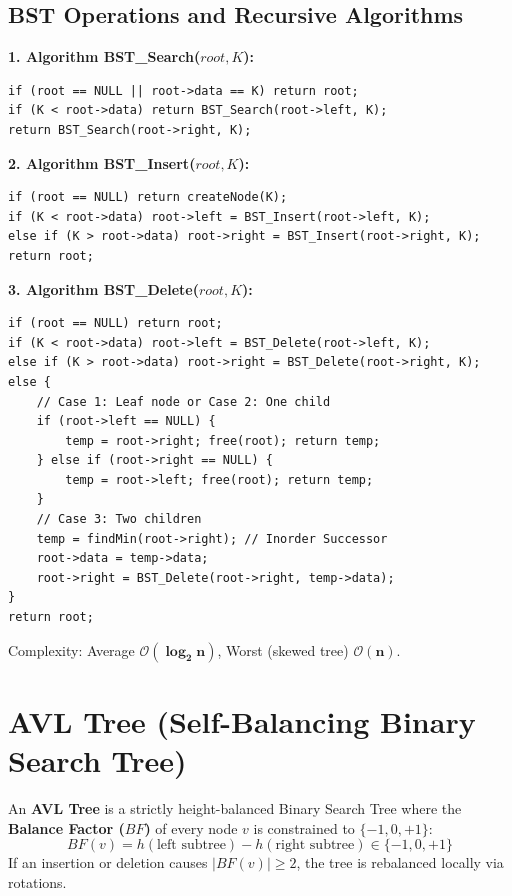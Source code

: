 \documentclass[12pt,a4paper]{article}
\begin{document}
\subsection{BST Operations and Recursive Algorithms}
\begin{tcolorbox}[formulabox, title={\textbf{Core Binary Search Tree Algorithms}}]
\textbf{1. Algorithm BST\_Search($root, K$):}
\begin{verbatim}
if (root == NULL || root->data == K) return root;
if (K < root->data) return BST_Search(root->left, K);
return BST_Search(root->right, K);
\end{verbatim}

\textbf{2. Algorithm BST\_Insert($root, K$):}
\begin{verbatim}
if (root == NULL) return createNode(K);
if (K < root->data) root->left = BST_Insert(root->left, K);
else if (K > root->data) root->right = BST_Insert(root->right, K);
return root;
\end{verbatim}

\textbf{3. Algorithm BST\_Delete($root, K$):}
\begin{verbatim}
if (root == NULL) return root;
if (K < root->data) root->left = BST_Delete(root->left, K);
else if (K > root->data) root->right = BST_Delete(root->right, K);
else {
    // Case 1: Leaf node or Case 2: One child
    if (root->left == NULL) {
        temp = root->right; free(root); return temp;
    } else if (root->right == NULL) {
        temp = root->left; free(root); return temp;
    }
    // Case 3: Two children
    temp = findMin(root->right); // Inorder Successor
    root->data = temp->data;
    root->right = BST_Delete(root->right, temp->data);
}
return root;
\end{verbatim}
Complexity: Average $\mathbf{\mathcal{O}(\log_2 n)}$, Worst (skewed tree) $\mathbf{\mathcal{O}(n)}$.
\end{tcolorbox}

\section{AVL Tree (Self-Balancing Binary Search Tree)}

\begin{tcolorbox}[defbox, title={\textbf{Definition: AVL Tree and Balance Factor}}]
An \textbf{AVL Tree} is a strictly height-balanced Binary Search Tree where the \textbf{Balance Factor ($BF$)} of every node $v$ is constrained to $\{-1, 0, +1\}$:
\begin{equation}
  BF(v) = h(\text{left subtree}) - h(\text{right subtree}) \in \{-1, 0, +1\}
\end{equation}
If an insertion or deletion causes $|BF(v)| \ge 2$, the tree is rebalanced locally via rotations.
\end{tcolorbox}
\end{document}
